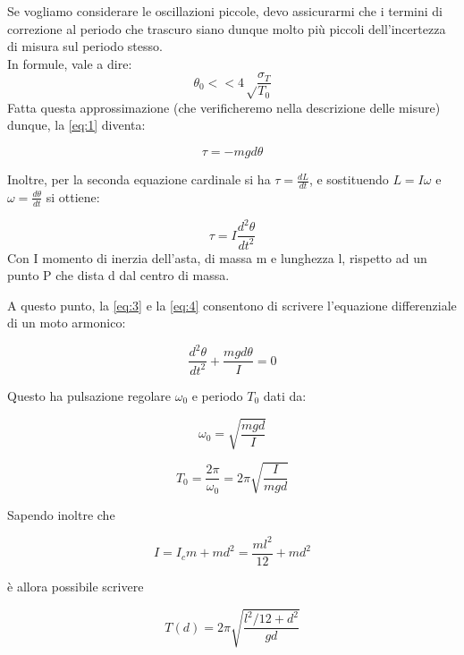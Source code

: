 \documentclass{article}
\begin{document}
Se vogliamo considerare le oscillazioni piccole, devo assicurarmi che i termini di correzione al periodo che trascuro siano dunque molto più piccoli dell'incertezza di misura sul periodo stesso.\\
In formule, vale a dire:
\begin{equation}
    \theta_0 << 4\sqrt\frac{\sigma_T}{T_0}
\end{equation}
Fatta questa approssimazione (che verificheremo nella descrizione delle misure) dunque, la \eqref{eq:1}
diventa:

\begin{equation}
    \label{eq:3}
    \tau = -mgd\theta
\end{equation}

Inoltre, per la seconda equazione cardinale si ha $\tau = \frac{dL}{dt}$, e sostituendo $L=I\omega$ e $\omega=\frac{d\theta}{dt}$ si ottiene:

\begin{equation}
    \label{eq:4}
    \tau = I\frac{d^2\theta}{dt^2}
\end{equation}
Con I momento di inerzia dell'asta, di massa m e lunghezza l, rispetto ad un punto P che dista d dal centro di massa. 

A questo punto, la \eqref{eq:3} e la \eqref{eq:4} consentono di scrivere l'equazione differenziale di un moto armonico:

\begin{equation}
    \frac{d^2\theta}{dt^2} + \frac{mgd\theta}{I} = 0
\end{equation}

Questo ha pulsazione regolare $\omega_0$ e periodo $T_0$ dati da:

\begin{equation}
    \omega_0 = \sqrt{\frac{mgd}{I}}
\end{equation}

\begin{equation}
    T_0 = \frac{2\pi}{\omega_0} = 2\pi\sqrt{\frac{I}{mgd}}
\end{equation}

Sapendo inoltre che 

\begin{equation}
    I = I_cm + md^2 = \frac{ml^2}{12} + md^2
\end{equation}

è allora possibile scrivere

\begin{equation}
    \label{eq:9}
    T(d) = 2\pi\sqrt{\frac{l^2/12 + d^2}{gd}}
\end{equation}
\end{document}
